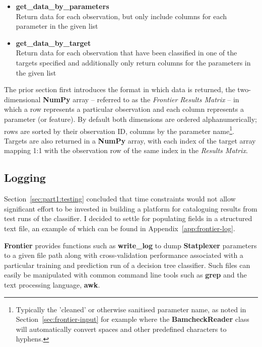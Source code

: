 \begin{itemize}
    \item \textbf{get\_data\_by\_parameters} \hfill\\
        Return data for each observation, but only include columns
        for each parameter in the given list
    \item \textbf{get\_data\_by\_target} \hfill\\
        Return data for each observation that have been classified in one of the
        targets specified and additionally only return columns for the
        parameters in the given list
\end{itemize}

The prior section first introduces the format in which data is returned, the
two-dimensional \textbf{NumPy} array -- referred to as the \textit{Frontier Results
Matrix} -- in which a row represents a particular observation and each column
represents a parameter (or feature). By default both dimensions are
ordered alphanumerically; rows are sorted by their observation ID, columns by
the parameter name\footnote{Typically the 'cleaned' or otherwise sanitised
    parameter name, as noted in Section~\ref{sec:frontier-input} for example
where the \textbf{BamcheckReader} class will automatically convert spaces and
other predefined characters to hyphens.}. Targets are also returned in a
\textbf{NumPy} array, with each index of the target array mapping 1:1 with the
observation row of the same index in the \textit{Results Matrix}.


\subsection{Logging}

Section~\ref{sec:part1:testing} concluded that time constraints would not allow
significant effort to be invested in building a platform for cataloguing results
from test runs of the classifier. I decided to settle for populating fields in a
structured text file, an example of which can be found in
Appendix~\ref{app:frontier-log}.

\textbf{Frontier} provides functions such as \textbf{write\_log} to dump
\textbf{Statplexer} parameters to a given file path along with cross-validation
performance associated with a particular training and prediction run of a
decision tree classifier. Such files can easily be manipulated with common
command line tools such as \textbf{grep} and the text processing language,
\textbf{awk}.


